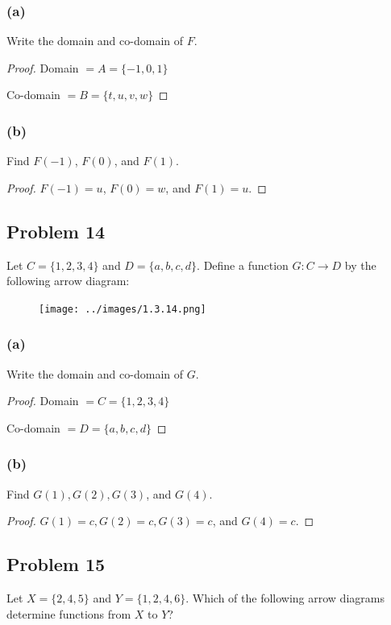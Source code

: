 \documentclass[14pt]{extarticle}
\begin{document}
\subsubsection{(a)}
Write the domain and co-domain of $F$.

\begin{proof}
Domain $ = A = \{-1, 0, 1\}$

Co-domain $ = B = \{t, u, v, w\}$
\end{proof}

\subsubsection{(b)}
Find $F(-1)$, $F(0)$, and $F(1)$.

\begin{proof}
$F(-1) = u$, $F(0) = w$, and $F(1)= u$.
\end{proof}

\subsection{Problem 14}
Let $C = \{1, 2, 3, 4\}$ and $D = \{a, b, c, d\}$. Define a function
$G: C \to D$ by the following arrow diagram:

\begin{figure}[ht!]
\centering
\texttt{[image: ../images/1.3.14.png]}
\end{figure}

\subsubsection{(a)}
Write the domain and co-domain of $G$.

\begin{proof}
Domain $ = C = \{1, 2, 3, 4\}$

Co-domain $ = D = \{a, b, c, d\}$
\end{proof}

\subsubsection{(b)}
Find $G(1), G(2), G(3)$, and $G(4)$.

\begin{proof}
$G(1) = c, G(2) = c, G(3) = c$, and $G(4) = c$.
\end{proof}

\subsection{Problem 15}
Let $X = \{2, 4, 5\}$ and $Y = \{1, 2, 4, 6\}$. Which of the following arrow
diagrams determine functions from $X$ to $Y$?
\end{document}
